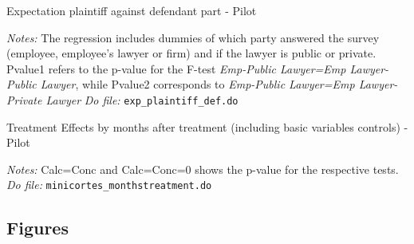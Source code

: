 \documentclass[11pt]{article}
\begin{document}
\begin{landscape}

\begin{table}[H]
\caption{Expectation plaintiff against defendant part - Pilot}
\label{Table_exp_plaintiff_def}
\begin{center}
\scriptsize{}
\end{center}
 \footnotesize
\textit{Notes:} 
The regression includes dummies of which party answered the survey (employee, employee's lawyer or firm) and if the lawyer is public or private. Pvalue1 refers to the p-value for the F-test \emph{ Emp-Public Lawyer=Emp Lawyer-Public Lawyer}, while Pvalue2 corresponds to \emph{ Emp-Public Lawyer=Emp Lawyer-Private Lawyer}
\textit{Do file: } \texttt{exp\_plaintiff\_def.do}
\end{table}

\end{landscape}

\begin{table}[H]
    \caption{Treatment Effects by months after treatment (including basic variables controls) - Pilot}
    \label{Table_effects}
    \begin{center}
    \scriptsize{}
    \end{center}
    \footnotesize
    \textit{Notes:} 
    Calc=Conc and Calc=Conc=0 shows the p-value for the respective tests.
    \textit{Do file: } \texttt{minicortes\_monthstreatment.do}
\end{table}

\pagebreak


\subsection{Figures}
\end{document}

